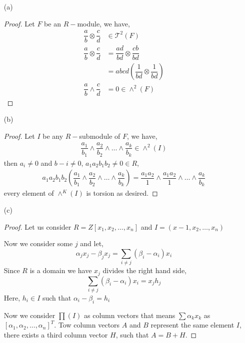 \documentclass[11pt]{article}
\newcommand{\lrp}[1]{\left(#1\right)}
\begin{document}
\begin{itemize}
    \item[(a)]
    \begin{proof}
        Let $F$ be an $R-$module, we have,
        \begin{align*}
            \dfrac{a}{b} \otimes \dfrac{c}{d} &\in \mathcal{T}^{2}(F) \\
            \dfrac{a}{b} \otimes \dfrac{c}{d} &= \dfrac{ad}{bd} \otimes \dfrac{cb}{bd} \\
            &= abcd\lrp{\dfrac{1}{bd} \otimes \dfrac{1}{bd}} \\
            \dfrac{a}{b}\wedge \dfrac{c}{d} &= 0 \in \wedge^{2}(F)
        \end{align*}
    \end{proof} 
    \item[(b)]
    \begin{proof}
        Let $I$ be any $R-$submodule of $F$, we have,
        \begin{align*}
            \dfrac{a_1}{b_1} \wedge \dfrac{a_2}{b_2} \wedge \dots \wedge \dfrac{a_k}{b_k} \in \wedge^{2}(I)
        \end{align*}
        then $a_i \neq 0$ and $b-i\neq 0$, $a_1a_2b_1b_2 \neq 0 \in R$,
        \begin{align*}
            a_1a_2b_1b_2\lrp{\dfrac{a_1}{b_1}\wedge \dfrac{a_2}{b_2} \wedge \dots \wedge \dfrac{a_k}{b_k}} = \dfrac{a_1a_2}{1}\wedge \dfrac{a_1a_2}{1} \wedge \dots \wedge \dfrac{a_k}{b_k}
        \end{align*}
        every element of $\wedge^{K}(I)$ is torsion as desired. 
    \end{proof} 
    \item[(c)]  
    \begin{proof}
        Let us consider $R = Z[x_1, x_2, \dots , x_n]$ and $I = (x-1, x_2, \dots, x_n )$

        Now we consider some $j$ and let,
        \[\alpha_j x_j - \beta_j x_j = \sum_{i \neq j}(\beta_i -\alpha_i )x_i\]
        Since $R$ is a domain we have $x_j$ divides the right hand side,
        \[\sum_{i \neq j} (\beta_i - \alpha_i)x_i = x_jh_j\]
        Here, $h_i \in I$ such that $\alpha_i -\beta_i = h_i$

        Now we consider $\prod(I)$ as column vectors that means $\sum\alpha_kx_k$ as $[\alpha_1,\alpha_2,\dots,\alpha_n]^{T}$. Tow column vectors $A$ and $B$ represent the same element $I$, there exists a third column vector $H$, such that $A = B + H$. 


\end{proof}
\end{itemize}
\end{document}
